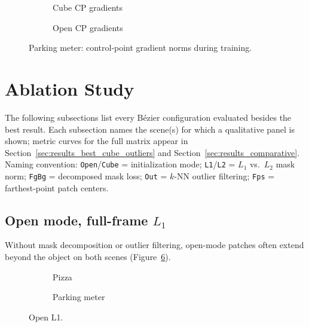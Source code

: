\documentclass{report}
\begin{document}
\begin{figure}[H]
    \centering
    \begin{subfigure}[t]{0.49\textwidth}
        \centering
        \caption{Cube CP gradients}
        \label{fig:parking_cube_gradients}
    \end{subfigure}
    \hfill
    \begin{subfigure}[t]{0.49\textwidth}
        \centering
        \caption{Open CP gradients}
        \label{fig:parking_open_gradients}
    \end{subfigure}
    \caption{Parking meter: control-point gradient norms during training.}
\end{figure}

\section{Ablation Study}
\label{sec:results_ablation}

The following subsections list every B\'ezier configuration evaluated besides the best result. Each subsection names the scene(s) for which a qualitative panel is shown; metric curves for the full matrix appear in Section~\ref{sec:results_best_cube_outliers} and Section~\ref{sec:results_comparative}. Naming convention: \texttt{Open}/\texttt{Cube} = initialization mode; \texttt{L1}/\texttt{L2} = $L_1$ vs.\ $L_2$ mask norm; \texttt{FgBg} = decomposed mask loss; \texttt{Out} = $k$-NN outlier filtering; \texttt{Fps} = farthest-point patch centers.

\subsection{Open mode, full-frame $L_1$}
\label{subsec:ablation_open_l1}

Without mask decomposition or outlier filtering, open-mode patches often extend beyond the object on both scenes (Figure~\ref{fig:ablation_open_l1}).

\begin{figure}[H]
    \centering
    \begin{subfigure}{\textwidth}
        \centering
        \caption{Pizza}
        \label{fig:ablation_open_l1_pizza}
    \end{subfigure}
    \vspace{0.6em}
    \begin{subfigure}{\textwidth}
        \centering
        \caption{Parking meter}
        \label{fig:ablation_open_l1_parking}
    \end{subfigure}
    \caption{Open L1.}
    \label{fig:ablation_open_l1}
\end{figure}
\end{document}
